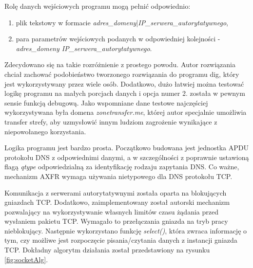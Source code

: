 Rolę danych wejściowych programu mogą pełnić odpowiednio:
\begin{enumerate}
	\item plik tekstowy w formacie \textit{adres\_domeny}|\textit{IP\_serwera\_autorytatywnego},
	\item para parametrów wejściowych podanych w odpowiedniej kolejności - \textit{adres\_domeny IP\_serwera\_autorytatywnego}.
\end{enumerate}
Zdecydowano się na takie rozróżnienie z prostego powodu. Autor rozwiązania chciał zachować podobieństwo tworzonego rozwiązania
do programu dig, który jest wykorzystywany przez wiele osób. Dodatkowo, dużo łatwiej można testować logikę programu na małych
porcjach danych i opcja numer 2. została w pewnym sensie funkcją debugową. Jako wspomniane dane testowe najczęściej wykorzystywana
była domena \textit{zonetransfer.me}\cite{zonetransfer}, której autor specjalnie umożliwia transfer strefy, aby uzmysłowić innym
ludziom zagrożenie wynikające z niepowołanego korzystania.

Logika programu jest bardzo prosta. Początkowo budowana jest jednostka APDU protokołu DNS z odpowiednimi danymi, a w szczególności
z poprawnie ustawioną flagą \textit{qtype} odpowiedzialną za identyfikację rodzaju zapytania DNS. Co ważne, mechanizm AXFR wymaga
używania nietypowego dla DNS protokołu TCP.

Komunikacja z serwerami autorytatywnymi została oparta na blokujących gniazdach TCP. Dodatkowo, zaimplementowany został autorski
mechanizm pozwalający na wykorzystywanie własnych limitów czasu żądania przed wysłaniem pakietu TCP. Wymagało to przełączania
gniazda na tryb pracy nieblokujący. Następnie wykorzystano funkcję \textit{select()}, która zwraca informację o tym, czy możliwe jest
rozpoczęcie pisania/czytania danych z instancji gniazda TCP. Dokładny algorytm działania został przedstawiony na rysunku \ref{fig:socketAlg}.

